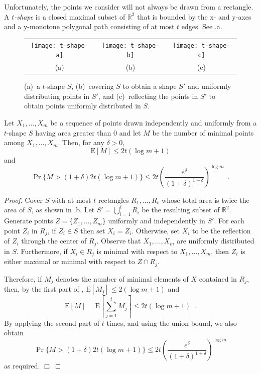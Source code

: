 \documentclass[10pt]{llncs}
\newcommand{\RR}{\mathbb{R}}
\newcommand{\PROB}{\Pr}
\newcommand{\EXP}{\mathrm{E}}
\begin{document}
Unfortunately, the points we consider will not always be drawn from a
rectangle.  A \emph{$t$-shape} is a closed maximal subset of $\RR^2$ that
is bounded by the $\mathrm x$- and $\mathrm y$-axes and a $\mathrm
y$-monotone polygonal path consisting of at most $t$ edges.  See
.a.

\begin{figure}
  \begin{center}
    \begin{tabular}{ccc}
      \texttt{[image: t-shape-a]} & 
      \texttt{[image: t-shape-b]} & 
      \texttt{[image: t-shape-c]} \\
      (a) & (b) & (c)
    \end{tabular}
  \end{center}
  \caption{(a)~a $t$-shape $S$, (b)~covering $S$ to obtain a shape $S'$ and
uniformly distributing points in $S'$, and (c)~reflecting the points in
$S'$ to obtain points uniformly distributed in $S$.}
\end{figure}

\begin{lem}
  Let $X_1,\ldots,X_m$ be a sequence of points drawn independently and
  uniformly from a $t$-shape $S$ having area greater than
  0 and let $M$ be the number of minimal points
  among $X_1,\ldots,X_m$.  Then, for any $\delta >0$,
  \begin{equation}
    \EXP[M] \le 2t(\log m + 1)
  \end{equation}
  and 
  \begin{equation}
    \PROB\{M>(1+\delta)2t(\log m+1)\} 
        \le 2t\left(\frac{e^\delta}{(1+\delta)^{1+\delta}}\right)^{\log m} 
	\enspace .
  \end{equation}
\end{lem}

\begin{proof}
Cover $S$ with at most $t$ rectangles $R_1,\ldots,R_\ell$ whose total area
is twice the area of $S$, as shown in .b.  Let
$S'=\bigcup_{i=1}^\ell R_i$ be the resulting subset of $\RR^2$.  Generate
points $Z=\{Z_1,\ldots,Z_m\}$ uniformly and independently in $S'$.  For each
point $Z_i$ in $R_j$, if $Z_i\in S$ then set $X_i=Z_i$.  Otherwise, set
$X_i$ to be the reflection of $Z_i$ through the center of $R_j$.  Observe
that $X_1,\ldots,X_m$ are uniformly distributed in $S$.  Furthermore, if
$X_i\in R_j$ is minimal with respect to $X_1,\ldots,X_m$, then $Z_i$ is either
maximal or minimal with respect to $Z \cap R_j$.

Therefore, if $M_j$ denotes the number of minimal elements of $X$ contained
in $R_j$, then, by the first part of , $\EXP[M_j]\le
2(\log m+1)$ and 
\[
     \EXP[M] = \EXP\left[\sum_{j=1}^t M_j\right] \le 2t(\log m + 1)
     \enspace .
\]
By applying the second part of  $t$ times,
and using the union bound, we also obtain
\[
    \PROB\{M>(1+\delta)2t(\log m+1)\} 
        \le 2t\left(\frac{e^\delta}{(1+\delta)^{1+\delta}}\right)^{\log m} 
\]
as required.
\hfill$\Box$\end{proof}
\end{document}
